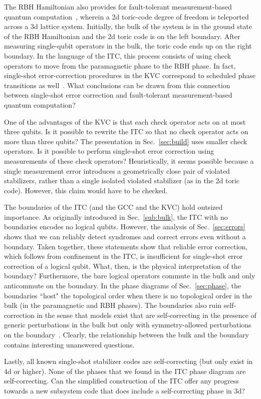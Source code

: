 The RBH Hamiltonian also provides for fault-tolerant measurement-based quantum computation~\cite{Raussendorf2006FaultTolerant}, wherein a 2d toric-code degree of freedom is teleported across a 3d lattice system. Initially, the bulk of the system is in the ground state of the RBH Hamiltonian and the 2d toric code is on the left boundary. After measuring single-qubit operators in the bulk, the toric code ends up on the right boundary. In the language of the ITC, this process consists of using check operators to move from the paramagnetic phase to the RBH phase. In fact, single-shot error-correction procedures in the KVC correspond to scheduled phase transitions as well~\cite{Li2023PhaseDiagram}. What conclusions can be drawn from this connection between single-shot error correction and fault-tolerant measurement-based quantum computation?

One of the advantages of the KVC is that each check operator acts on at most three qubits. Is it possible to rewrite the ITC so that no check operator acts on more than three qubits? The presentation in Sec.~\ref{sec:build} uses smaller check operators. Is it possible to perform single-shot error correction using measurements of these check operators? Heuristically, it seems possible because a single measurement error introduces a geometrically close pair of violated stabilizers, rather than a single isolated violated stabilizer (as in the 2d toric code). However, this claim would have to be checked.

The boundaries of the ITC (and the GCC and the KVC) hold outsized importance. As originally introduced in Sec.~\ref{sub:bulk}, the ITC with no boundaries encodes no logical qubits. However, the analysis of Sec.~\ref{sec:errors} shows that we can reliably detect syndromes and correct errors even without a boundary. Taken together, these statements show that reliable error correction, which follows from confinement in the ITC, is insufficient for single-shot error correction of a logical qubit. What, then, is the physical interpretation of the boundary? Furthermore, the bare logical operators commute in the bulk and only anticommute on the boundary. In the phase diagrams of Sec.~\ref{sec:phase}, the boundaries ``host" the topological order when there is no topological order in the bulk (in the paramagnetic and RBH phases). The boundaries also ruin self-correction in the sense that models exist that are self-correcting in the presence of generic perturbations in the bulk but only with symmetry-allowed perturbations on the boundary~\cite{Stahl2022Symmetry}. Clearly, the relationship between the bulk and the boundary contains interesting unanswered questions.

Lastly, all known single-shot stabilizer codes are self-correcting (but only exist in 4d or higher). None of the phases that we found in the ITC phase diagram are self-correcting. Can the simplified construction of the ITC offer any progress towards a new subsystem code that does include a self-correcting phase in 3d?

